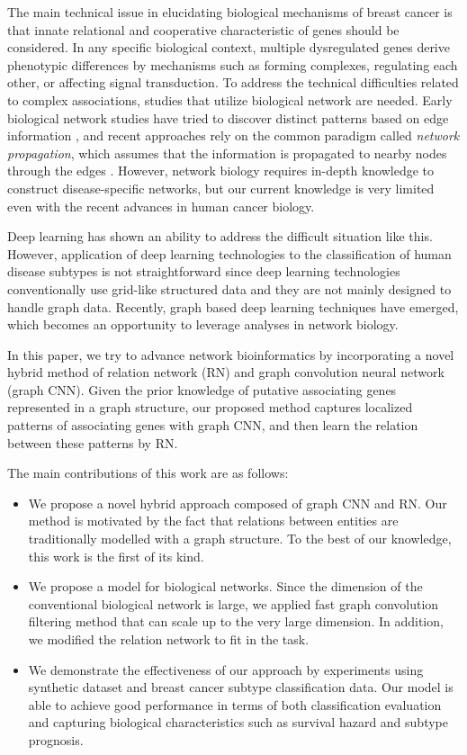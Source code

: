 \documentclass{article}
\begin{document}
The main technical issue in elucidating biological mechanisms of breast cancer is that innate relational and cooperative characteristic of genes should be considered. In any specific biological context, multiple dysregulated genes derive phenotypic differences by mechanisms such as forming complexes, regulating each other, or affecting signal transduction. 
To address the technical difficulties related to complex associations, studies that utilize biological network are needed.
Early biological network studies have tried to discover distinct patterns based on edge information \cite{barabasi2004network,barabasi2011network}, and recent approaches rely on the common paradigm called \textit{network propagation}, which assumes that the information is propagated to nearby nodes through the edges \cite{cowen2017network}. 
However, network biology requires in-depth knowledge to construct disease-specific networks, but our current knowledge is very limited even with the recent advances in human cancer biology.

Deep learning has shown an ability to address the difficult situation like this. However, application of deep learning technologies to the classification of human disease subtypes is not straightforward since deep learning technologies conventionally use grid-like structured data and they are not mainly designed to handle graph data.
Recently, graph based deep learning techniques have emerged, which becomes an opportunity to leverage analyses in network biology.

In this paper, we try to advance network bioinformatics by incorporating a novel hybrid method of relation network (RN) and graph convolution neural network (graph CNN). Given the prior knowledge of putative associating genes represented in a graph structure, our proposed method captures localized patterns of associating genes with graph CNN, and then learn the relation between these patterns by RN.

The main contributions of this work are as follows:
\begin{itemize}
\item We propose a novel hybrid approach composed of graph CNN and RN. Our method is motivated by the fact that relations between entities are traditionally modelled with a graph structure. To the best of our knowledge, this work is the first of its kind.
\item We propose a model for biological networks. Since the dimension of the conventional biological network is large, we applied fast graph convolution filtering method that can scale up to the very large dimension. In addition, we modified the relation network to fit in the task.
\item We demonstrate the effectiveness of our approach by experiments using synthetic dataset and breast cancer subtype classification data. Our model is able to achieve good performance in terms of both classification evaluation and capturing biological characteristics such as survival hazard and subtype prognosis.
\end{itemize}
\end{document}
